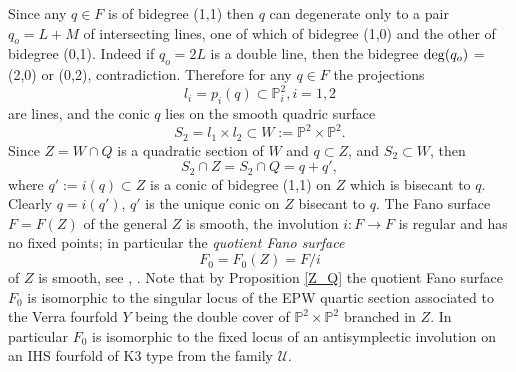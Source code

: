 \documentclass[a4paper,11pt]{amsart}
\theoremstyle{definition}
\numberwithin{equation}{section}
\numberwithin{equation}{section} \theoremstyle{definition}
\begin{document}
Since any $q \in F$ is of bidegree (1,1) then 
$q$ can degenerate only to a pair $q_o = L+M$ of 
intersecting lines, one of which of bidegree (1,0) 
and the other of bidegree (0,1). 
Indeed if $q_o = 2L$ is a double line, then the bidegree 
${\rm deg}(q_o)$ = (2,0) or (0,2), contradiction.  
Therefore for any $q \in F$ the projections 
$$l_i = p_i(q) \subset {{\mathbb{P}}}^2_i, i = 1,2$$
are lines, and  the conic $q$ lies on the  
smooth quadric surface 
$$
S_2 = l_1 \times l_2 \subset W:={{\mathbb{P}}}^2\times {{\mathbb{P}}}^2.
$$
Since $Z = W \cap Q$ is a quadratic section of $W$ and $q \subset Z$, 
and $S_2 \subset W$, then 
$$
S_2 \cap Z = S_2 \cap Q = q + q',
$$
where $q' := i(q) \subset Z$
is a conic of bidegree (1,1) on $Z$ which is bisecant to $q$. 
Clearly $q = i(q')$, $q'$ is the unique conic on $Z$ bisecant 
to $q$.   
The Fano surface $F = F(Z)$ of the general $Z$ is smooth, 
the involution $i:F \rightarrow F$ is regular and has no fixed 
points; in particular the {\it quotient Fano surface} 
$$
F_0 = F_0(Z) = F/i
$$ 
of $Z$ is smooth, see \cite{Iliev}, \cite{DIM}.   
 Note that by Proposition \ref{Z_Q} the quotient Fano surface $F_0$ is isomorphic to the singular locus of the EPW quartic section 
 associated to the Verra fourfold $Y$ being the double cover of ${{\mathbb{P}}}^2\times {{\mathbb{P}}}^2$ branched in $Z$. In particular $F_0$ is isomorphic to the fixed locus of an antisymplectic involution on an IHS fourfold of K3 type from the family $\mathcal{U}$.
\medskip
\end{document}

